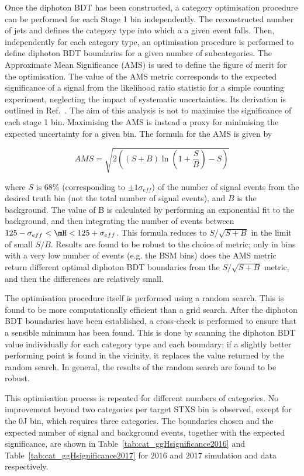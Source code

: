 Once the diphoton BDT has been constructed, 
a category optimisation procedure can be performed for each Stage 1 bin independently.
The reconstructed number of jets and \ptgg defines the category type into which a a given event falls.
Then, independently for each category type, 
an optimisation procedure is performed to define diphoton BDT boundaries 
for a given number of subcategories.
The Approximate Mean Significance (AMS) is used to define the figure of merit for the optimisation.
The value of the AMS metric corresponds to the expected significance of a signal 
from the likelihood ratio statistic for a simple counting experiment, 
neglecting the impact of systematic uncertainties.
Its derivation is outlined in Ref.~\cite{Asymptotic}.
The aim of this analysis is not to maximise the significance of each stage 1 bin.
Maximising the AMS is instead a proxy for minimising the expected uncertainty for a given bin.
The formula for the AMS is given by 

\begin{equation*}
  AMS = \sqrt{ 2 \left( (S+B) \ln{\left(1+\frac{S}{B}\right)} - S \right) }
\end{equation*}

where $S$ is 68\% (corresponding to $\pm 1\sigma_{eff}$) of the number of signal events 
from the desired truth bin (not the total number of signal events), and $B$ is the background.
The value of B is calculated by performing an exponential fit to the background, 
and then integrating the number of events between $125 - \sigma_{eff} < \mH < 125 + \sigma_{eff}$.
This formula reduces to $S/\sqrt{S+B}$ in the limit of small $S/B$.
Results are found to be robust to the choice of metric; 
only in bins with a very low number of events (e.g. the BSM bins) 
does the AMS metric return different optimal diphoton BDT boundaries from the $S/\sqrt{S+B}$ metric, 
and then the differences are relatively small.

The optimisation procedure itself is performed using a random search. 
This is found to be more computationally efficient than a grid search.
After the diphoton BDT boundaries have been established, 
a cross-check is performed to ensure that a sensible minimum has been found.
This is done by scanning the diphoton BDT value individually for each category type and each boundary; 
if a slightly better performing point is found in the vicinity, 
it replaces the value returned by the random search.
In general, the results of the random search are found to be robust.

This optimisation process is repeated for different numbers of categories.
No improvement beyond two categories per target STXS bin is observed, 
except for the 0J bin, which requires three categories.
The boundaries chosen and the expected number of signal and background events, 
together with the expected significance, 
are shown in Table~\ref{tab:cat_ggHsignificance2016} and Table~\ref{tab:cat_ggHsignificance2017} 
for 2016 and 2017 simulation and data respectively.


